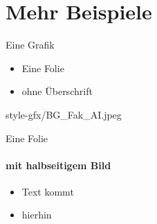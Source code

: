 \documentclass[t,
aspectratio=169,  %
]{beamer}
\begin{document}
\section{Mehr Beispiele}

\begin{frame}{Eine Grafik}
	\begin{center}
	\end{center}
\end{frame}

\begin{frame}{}
	\begin{itemize}
		\item Eine Folie
		\item ohne Überschrift
	\end{itemize}
\end{frame}

\begin{halfpage}{style-gfx/BG_Fak_AI.jpeg} %
\begin{frame}{Eine Folie}
	\framesubtitle{mit halbseitigem Bild}
	\begin{itemize}
		\item Text kommt
		\item hierhin
	\end{itemize}
\end{frame}
\end{halfpage}
\end{document}
